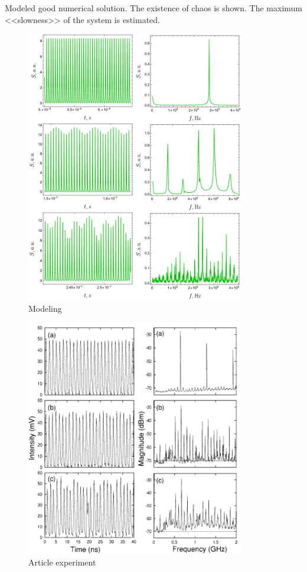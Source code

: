 Modeled good numerical solution. The existence of chaos is shown. The maximum <<slowness>> of the system is estimated.

\begin{minipage}[b]{0.49\textwidth}
      \begin{figure}[h]
          \centering
          \includegraphics[width=0.85\textwidth]{figures/modeling_vertical.pdf}
          \caption{Modeling}
      \end{figure}
\end{minipage}
\hfill
\begin{minipage}[b]{0.49\textwidth}
    \begin{figure}[h]
    \centering
    \includegraphics[width=0.85\textwidth]{images/tang_exp.png}
    \caption{Article experiment}
    \end{figure}
\end{minipage}

